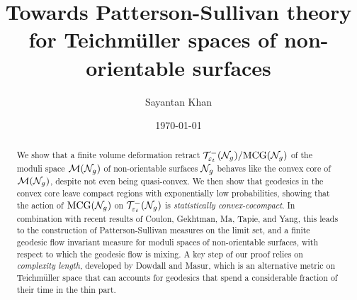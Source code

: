 \documentclass[12pt, reqno]{amsart}
\title[Towards Patterson-Sullivan theory for $\teich(\no_g)$]{Towards Patterson-Sullivan theory for Teichmüller spaces of non-orientable surfaces}
\author{Sayantan Khan}
\date{\today}
\begin{document}
\begin{abstract}
  We show that a finite volume deformation retract $\mathcal{T}_{\varepsilon_t}^{-}(\mathcal{N}_g)/\mathrm{MCG}(\mathcal{N}_g)$ of the moduli space $\mathcal{M}(\mathcal{N}_g)$ of non-orientable surfaces $\mathcal{N}_g$ behaves like the convex core of $\mathcal{M}(\mathcal{N}_g)$, despite not even being quasi-convex.
  We then show that geodesics in the convex core leave compact regions with exponentially low probabilities, showing that the action of $\mathrm{MCG}(\mathcal{N}_g)$ on $\mathcal{T}_{\varepsilon_t}^{-}(\mathcal{N}_g)$ is \emph{statistically convex-cocompact}.
  In combination with recent results of Coulon, Gekhtman, Ma, Tapie, and Yang, this leads to the construction of Patterson-Sullivan measures on the limit set, and a finite geodesic flow invariant measure for moduli spaces of non-orientable surfaces, with respect to which the geodesic flow is mixing.
  A key step of our proof relies on \emph{complexity length}, developed by Dowdall and Masur, which is an alternative metric on Teichmüller space that can accounts for geodesics that spend a considerable fraction of their time in the thin part.
\end{abstract}
\maketitle












\appendix



\printbibliography
\end{document}

